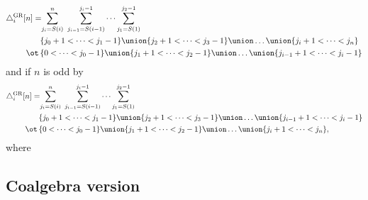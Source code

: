 \begin{align*}
\triangle^{\mathrm{GR}}_i [n] = \!
& \sum_{j_i=S(i)}^{n} \ \sum_{j_{i-1}=S(i-1)}^{j_i-1} \dots \sum_{j_1=S(1)}^{j_2-1} \\
& \{j_0+1 < \dots < j_1-1\} \union \{j_2+1 < \dots < j_3-1\} \union \dots \union \{j_i+1 < \dots < j_n\}\\ \ot \,
& \{0 < \dots < j_0-1\} \union \{j_1+1 < \dots < j_2-1\} \union \dots \union \{j_{i-1}+1 < \dots < j_i-1\}
\end{align*}
and if $n$ is odd by
\begin{align*}
\triangle^{\mathrm{GR}}_i [n] = \!
& \sum_{j_i=S(i)}^{n} \ \sum_{j_{i-1}=S(i-1)}^{j_i-1} \dots \sum_{j_1=S(1)}^{j_2-1} \\
& \{j_0+1 < \dots < j_1-1\} \union \{j_2+1 < \dots < j_3-1\} \union \dots \union \{j_{i-1}+1 < \dots < j_i-1\}\\ \ot \,
& \{0 < \dots < j_0-1\} \union \{j_1+1 < \dots < j_2-1\} \union \dots \union \{j_i+1 < \dots < j_n\},
\end{align*}
where



%

\subsection{Coalgebra version}

